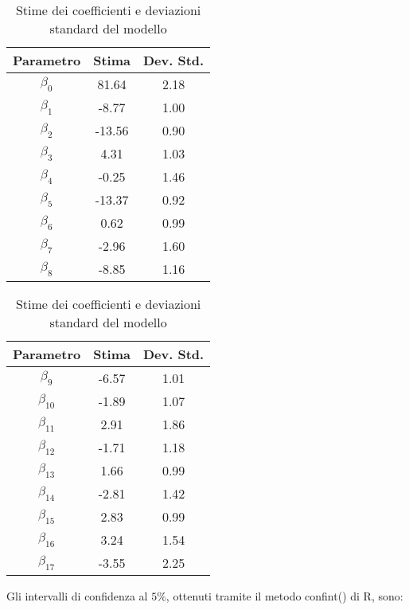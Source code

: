 \begin{table}[H]
	\centering
	\begin{minipage}{0.48\textwidth}
		\centering
		\begin{tabular}{|c|c|c|}
			\hline
			\textbf{Parametro} & \textbf{Stima} & \textbf{Dev. Std.} \\
			\hline
			$\beta_0$   & 81.64  & 2.18 \\
			$\beta_1$   & -8.77  & 1.00 \\
			$\beta_2$   & -13.56 & 0.90 \\
			$\beta_3$   & 4.31   & 1.03 \\
			$\beta_4$   & -0.25  & 1.46 \\
			$\beta_5$   & -13.37 & 0.92 \\
			$\beta_6$   & 0.62   & 0.99 \\
			$\beta_7$   & -2.96  & 1.60 \\
			$\beta_8$   & -8.85  & 1.16 \\
			\hline
		\end{tabular}
	\end{minipage}
	\hfill
	\begin{minipage}{0.48\textwidth}
		\centering
		\begin{tabular}{|c|c|c|}
			\hline
			\textbf{Parametro} & \textbf{Stima} & \textbf{Dev. Std.} \\
			\hline
			$\beta_9$   & -6.57  & 1.01 \\
			$\beta_{10}$ & -1.89  & 1.07 \\
			$\beta_{11}$ & 2.91   & 1.86 \\
			$\beta_{12}$ & -1.71  & 1.18 \\
			$\beta_{13}$ & 1.66   & 0.99 \\
			$\beta_{14}$ & -2.81  & 1.42 \\
			$\beta_{15}$ & 2.83   & 0.99 \\
			$\beta_{16}$ & 3.24   & 1.54 \\
			$\beta_{17}$ & -3.55  & 2.25 \\
			\hline
		\end{tabular}
	\end{minipage}
	\caption{Stime dei coefficienti e deviazioni standard del modello}
	\label{tab:stima_coef_std}
\end{table}
Gli intervalli di confidenza al $5\%$, ottenuti tramite il metodo confint() di R, sono:
